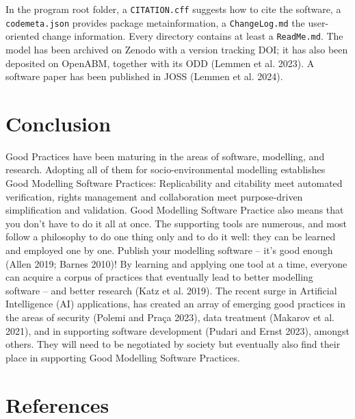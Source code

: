 \documentclass[preprint,11pt,5p]{elsarticle}
\begin{document}
In the program root folder, a \texttt{CITATION.cff} suggests how to cite
the software, a \texttt{codemeta.json} provides package metainformation,
a \texttt{ChangeLog.md} the user-oriented change information. Every
directory contains at least a \texttt{ReadMe.md}. The model has been
archived on Zenodo with a version tracking DOI; it has also been
deposited on OpenABM, together with its ODD (Lemmen et al. 2023). A
software paper has been published in JOSS (Lemmen et al. 2024).

\section{Conclusion}\label{conclusion}

Good Practices have been maturing in the areas of software, modelling,
and research. Adopting all of them for socio-environmental modelling
establishes Good Modelling Software Practices: Replicability and
citability meet automated verification, rights management and
collaboration meet purpose-driven simplification and validation. Good
Modelling Software Practice also means that you don't have to do it all
at once. The supporting tools are numerous, and most follow a philosophy
to do one thing only and to do it well: they can be learned and employed
one by one. Publish your modelling software -- it's good enough (Allen
2019; Barnes 2010)! By learning and applying one tool at a time,
everyone can acquire a corpus of practices that eventually lead to
better modelling software -- and better research (Katz et al. 2019). The
recent surge in Artificial Intelligence (AI) applications, has created
an array of emerging good practices in the areas of security (Polemi and
Praça 2023), data treatment (Makarov et al. 2021), and in supporting
software development (Pudari and Ernst 2023), amongst others. They will
need to be negotiated by society but eventually also find their place in
supporting Good Modelling Software Practices.

\section*{References}\label{references}
\end{document}

